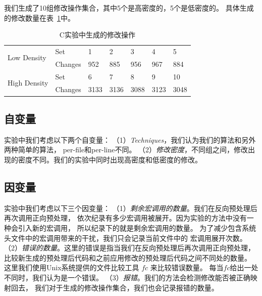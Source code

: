 我们生成了10组修改操作集合，其中5个是高密度的，5个是低密度的。
具体生成的修改数量在表~\ref{tbl:changes}中。
\begin{table}[htbp]
\caption{C实验中生成的修改操作}\label{tbl:changes}
\centering
\begin{tabular}{|l|l|lllll|}
  \hline
  \multirow{2}{2cm}{Low Density} & Set & 1 & 2 & 3 & 4 & 5  \\
  \cline{2-7}
                                 & Changes & 952 & 885 & 956 & 967 & 884 \\
  \hline
  \multirow{2}{2cm}{High Density} & Set & 6 & 7 & 8 & 9 & 10 \\
  \cline{2-7}
                                 & Changes & 3133 & 3136 & 3088 & 3123 & 3048\\
  \hline
\end{tabular}
\end{table}

\subsection{自变量}
实验中我们考虑以下两个自变量：
（1）\emph{Techniques}，我们认为我们的算法和另外两种简单的算法，
per-file和per-line不同。
（2）\emph{修改密度}，不同组之间，修改出现的密度不同。我们的实验中同时出现高密度和低密度的修改。

\subsection{因变量}
实验中我们考虑以下三个因变量：
（1）\emph{剩余宏调用的数量}。我们在反向预处理后再次调用正向预处理，
  依次纪录有多少宏调用被展开。因为实验的方法中没有一种会引入新的宏调用，
  所以纪录下的就是剩余宏调用的数量。
  为了减少包含系统头文件中的宏调用带来的干扰，我们只会记录当前文件中的
  宏调用展开次数。
（2）\emph{错误的数量}。这里的错误是指当我们在反向预处理后再次调用正向预处理，
  比较新生成的预处理后代码和之前应用修改的预处理后代码之间不同处的数量。
  这里我们使用Unix系统提供的文件比较工具 $fc$ 来比较错误数量。
  每当$fc$给出一处不同时，我们认为是一个错误。
（3）\emph{报错}。我们的方法会检测修改能否被正确映射回去，
我们对于生成的修改操作集合，我们也会记录报错的数量。


